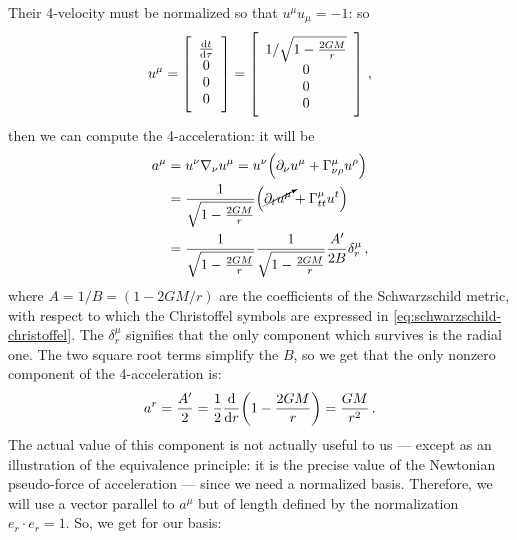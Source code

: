 \documentclass[main.tex]{subfiles}
\begin{document}
Their 4-velocity must be normalized so that \(u^{\mu } u_{\mu }= -1\): so 
%
\begin{align}
  u^{\mu } = \left[\begin{array}{c}
  \dv{t}{\tau } \\ 
  0 \\ 
  0 \\ 
  0
  \end{array}\right]
  = 
  \left[\begin{array}{c}
  1/\sqrt{1 - \frac{2GM}{r}} \\ 
  0 \\ 
  0 \\ 
  0
  \end{array}\right]
\,,
\end{align}
%
then we can compute the 4-acceleration: it will be 
%
\begin{align}
  a^{\mu } &= u^{\nu } \nabla_{\nu } u^{\mu }
  = u^{\nu } \qty(\partial_{\nu } u^{\mu } + \Gamma^{\mu }_{\nu \rho } u^{\rho })  \\
  &= \frac{1}{\sqrt{1 - \frac{2GM}{r}}} \qty(\cancelto{}{\partial_{t} u^{\mu }} + \Gamma^{\mu }_{tt} u^{t})  \\
  &= \frac{1}{\sqrt{1-\frac{2GM}{r}}}
  \frac{1}{\sqrt{1-\frac{2GM}{r}}} \frac{A'}{2B} \delta^{\mu }_{r}
\,,
\end{align}
%
where \(A = 1/B = (1 - 2GM/r)\) are the coefficients of the Schwarzschild metric, with respect to which the Christoffel symbols are expressed in \eqref{eq:schwarzschild-christoffel}. 
The \(\delta^{\mu }_{r}\) signifies that the only component which survives is the radial one.
The two square root terms simplify the \(B\), so we get that the only nonzero component of the 4-acceleration is:
%
\begin{align}
  a^{r} = \frac{A^{\prime }}{2} =
  \frac{1}{2} \dv{}{r} \qty(1 - \frac{2GM}{r})
  = \frac{GM}{r^2}
\,.
\end{align}
%
The actual value of this component is not actually useful to us --- except as an illustration of the equivalence principle: it is the precise value of the Newtonian pseudo-force of acceleration --- since we need a normalized basis. Therefore, we will use a vector parallel to \(a^{\mu }\) but of length defined by the normalization \(e_{r} \cdot e_{r} = 1\). So, we get for our basis: 
%
\end{document}
